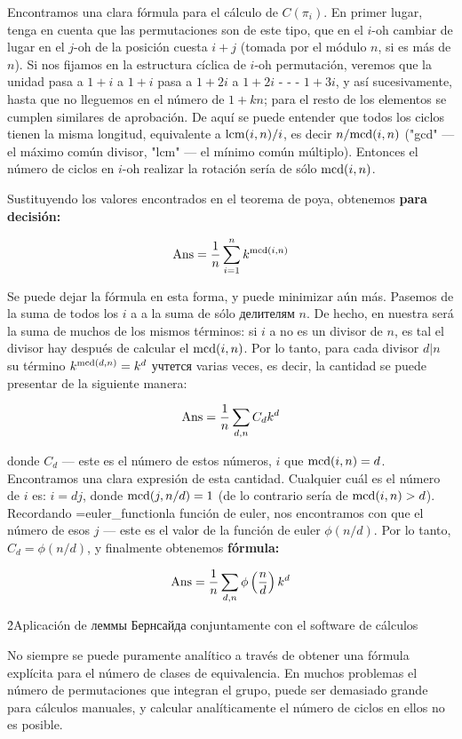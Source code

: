 Encontramos una clara fórmula para el cálculo de $C(\pi_i)$. En primer lugar, tenga en cuenta que las permutaciones son de este tipo, que en el $i$-oh cambiar de lugar en el $j$-oh de la posición cuesta $i+j$ (tomada por el módulo $n$, si es más de $n$). Si nos fijamos en la estructura cíclica de $i$-oh permutación, veremos que la unidad pasa a $1+i$ a $1+i$ pasa a $1+2i$ a $1+2i$ - - - $1+3i$, y así sucesivamente, hasta que no lleguemos en el número de $1 + kn$; para el resto de los elementos se cumplen similares de aprobación. De aquí se puede entender que todos los ciclos tienen la misma longitud, equivalente a ${\rm lcm}(i,n) / i$, es decir $n / {\rm mcd}(i,n)$ ("gcd" --- el máximo común divisor, "lcm" --- el mínimo común múltiplo). Entonces el número de ciclos en $i$-oh realizar la rotación sería de sólo ${\rm mcd}(i,n)$.

Sustituyendo los valores encontrados en el teorema de poya, obtenemos \bf{para decisión}:

$$ {\rm Ans} = \frac{1}{n} \sum_{i=1}^{n} k ^ {{\rm mcd}(i,n)} $$

Se puede dejar la fórmula en esta forma, y puede minimizar aún más. Pasemos de la suma de todos los $i$ a a la suma de sólo делителям $n$. De hecho, en nuestra será la suma de muchos de los mismos términos: si $i$ a no es un divisor de $n$, es tal el divisor hay después de calcular el ${\rm mcd}(i,n)$. Por lo tanto, para cada divisor $d|n$ su término $k^{{\rm mcd}(d,n)} = k^d$ учтется varias veces, es decir, la cantidad se puede presentar de la siguiente manera:

$$ {\rm Ans} = \frac{1}{n} \sum_{d, n} C_d k^d $$

donde $C_d$ --- este es el número de estos números, $i$ que ${\rm mcd}(i,n) = d$. Encontramos una clara expresión de esta cantidad. Cualquier cuál es el número de $i$ es: $i=dj$, donde ${\rm mcd}(j,n/d) = 1$ (de lo contrario sería de ${\rm mcd}(i,n) > d$). Recordando \algohref=euler_function{la función de euler}, nos encontramos con que el número de esos $j$ --- este es el valor de la función de euler $\phi(n/d)$. Por lo tanto, $C_d = \phi(n/d)$, y finalmente obtenemos \bf{fórmula}:

$$ {\rm Ans} = \frac{1}{n} \sum_{d, n} \phi \left( \frac{n}{d} \right) k^d $$

\h2{Aplicación de леммы Бернсайда conjuntamente con el software de cálculos}

No siempre se puede puramente analítico a través de obtener una fórmula explícita para el número de clases de equivalencia. En muchos problemas el número de permutaciones que integran el grupo, puede ser demasiado grande para cálculos manuales, y calcular analíticamente el número de ciclos en ellos no es posible.

